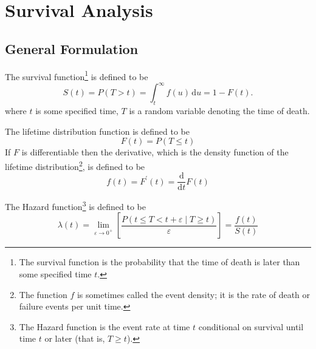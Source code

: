 \chapter{Survival Analysis}

\section{General Formulation}

\begin{definition}
    The survival function\footnote{The survival function is the probability that the time of death is later than some specified time $t$.} is defined to be
    \begin{equation}
        S(t)=P(T>t)=\int_{t}^{\infty}f(u)\,\mathrm{d}u=1-F(t) .
    \end{equation}
    where $t$ is some specified time, $T$ is a random variable denoting the time of death.
\end{definition}

\begin{definition}
    The lifetime distribution function is defined to be
    \begin{equation}
        F(t)=P(T\leq t)
    \end{equation}
    If $F$ is differentiable then the derivative, which is the density function of the lifetime distribution\footnote{The function $f$ is sometimes called the event density; it is the rate of death or failure events per unit time.}, is defined to be
    \begin{equation}
        f(t)=F^{\prime}(t)=\frac{\mathrm{d}}{\mathrm{d}t}F(t)
    \end{equation}
\end{definition}

\begin{definition}
    The Hazard function\footnote{The Hazard function is the event rate at time $t$ conditional on survival until time $t$ or later (that is, $T\geq t$).} is defined to be
    \begin{equation}
        \lambda(t)=\lim_{\varepsilon\rightarrow 0^{+}}\left[\frac{P(t\leq T<t+\varepsilon\mid T\geq t)}{\varepsilon}\right]=\frac{f(t)}{S(t)}
    \end{equation}
\end{definition}

